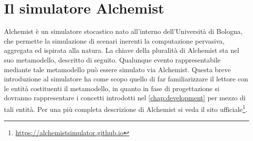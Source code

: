 \documentclass[12pt,a4paper,openright,oneside]{book}
\begin{document}
\section{Il simulatore Alchemist}
Alchemist \cite{alchemist-jos2013} è un simulatore stocastico nato all’interno dell’Università di Bologna, che permette la simulazione di scenari inerenti la computazione pervasiva, aggregata ed ispirata alla natura. La chiave della pluralità di Alchemist sta nel suo metamodello, descritto di seguito. Qualunque evento rappresentabile mediante tale metamodello può essere simulato via Alchemist. Questa breve introduzione al simulatore ha come scopo quello di far familiarizzare il lettore con le entità costituenti il metamodello, in quanto in fase di progettazione si dovranno rappresentare i concetti introdotti nel \cref{chap:development} per mezzo di tali entità. Per una più completa descrizione di Alchemist si veda il sito ufficiale\footnote{\url{https://alchemistsimulator.github.io}}.
\end{document}
